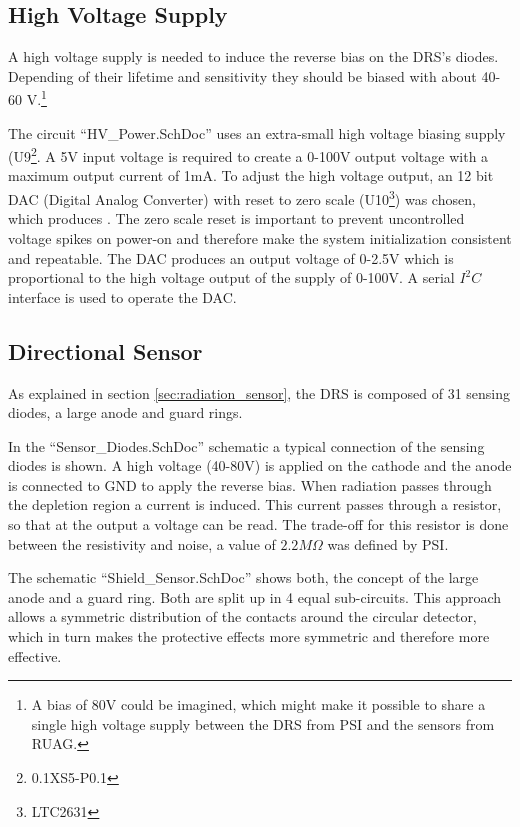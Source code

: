 \subsection{High Voltage Supply}
\label{sec:hv_supply}
A high voltage supply is needed to induce the reverse bias on the DRS's diodes.
Depending of their lifetime and sensitivity they should be biased with about 40-60 V.\footnote{A bias of 80V could be imagined, which might make it possible to share a single high voltage supply between the DRS from PSI and the sensors from RUAG.} 

The circuit ``HV\_Power.SchDoc'' uses an extra-small high voltage biasing supply (U9\footnote{0.1XS5-P0.1}.
A 5V input voltage is required to create a 0-100V output voltage with a maximum output current of 1mA.
To adjust the high voltage output, an 12 bit DAC (Digital Analog Converter) with reset to zero scale (U10\footnote{LTC2631}) was chosen, which produces .
The zero scale reset is important to prevent uncontrolled voltage spikes on power-on and therefore make the system initialization consistent and repeatable.
The DAC produces an output voltage of 0-2.5V which is proportional to the high voltage output of the supply of 0-100V.
A serial $I^2C$ interface is used to operate the DAC.

\subsection{Directional Sensor}
\label{sec:directionality Sensor}
As explained in section \ref{sec:radiation_sensor}, the DRS is composed of 31 sensing diodes, a large anode and guard rings.

In the ``Sensor\_Diodes.SchDoc'' schematic a typical connection of the sensing diodes is shown.
A high voltage (40-80V) is applied on the cathode and the anode is connected to GND to apply the reverse bias.
When radiation passes through the depletion region a current is induced.
This current passes through a resistor, so that at the output a voltage can be read.
The trade-off for this resistor is done between the resistivity and noise, a value of $2.2M\Omega$ was defined by PSI.

The schematic ``Shield\_Sensor.SchDoc'' shows both, the concept of the large anode and a guard ring.
Both are split up in 4 equal sub-circuits.
This approach allows a symmetric distribution of the contacts around the circular detector, which in turn makes the protective effects more symmetric and therefore more effective. 

